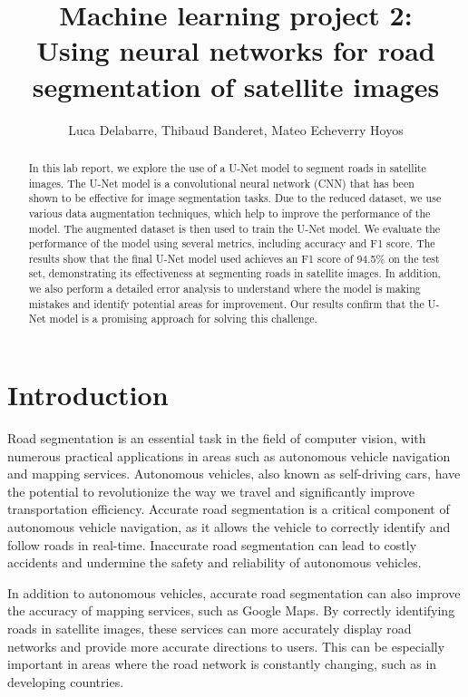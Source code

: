 \documentclass[10pt,conference,compsocconf]{IEEEtran}
\begin{document}
\title{\Large{Machine learning project 2:\\
Using neural networks for road segmentation of satellite images}}

\author{Luca Delabarre, Thibaud Banderet, Mateo Echeverry Hoyos}

\maketitle

\begin{abstract}
In this lab report, we explore the use of a U-Net model to segment roads in satellite images. The U-Net model is a convolutional neural network (CNN) that has been shown to be effective for image segmentation tasks. Due to the reduced dataset, we use various data augmentation techniques, which help to improve the performance of the model. The augmented dataset is then used to train the U-Net model. We evaluate the performance of the model using several metrics, including accuracy and F1 score. The results show that the final U-Net model used achieves an F1 score of 94.5\% on the test set, demonstrating its effectiveness at segmenting roads in satellite images. In addition, we also perform a detailed error analysis to understand where the model is making mistakes and identify potential areas for improvement. Our results confirm that the U-Net model is a promising approach for solving this challenge.
\end{abstract}

\section{Introduction}
Road segmentation is an essential task in the field of computer vision, with numerous practical applications in areas such as autonomous vehicle navigation and mapping services. Autonomous vehicles, also known as self-driving cars, have the potential to revolutionize the way we travel and significantly improve transportation efficiency. Accurate road segmentation is a critical component of autonomous vehicle navigation, as it allows the vehicle to correctly identify and follow roads in real-time. Inaccurate road segmentation can lead to costly accidents and undermine the safety and reliability of autonomous vehicles.

In addition to autonomous vehicles, accurate road segmentation can also improve the accuracy of mapping services, such as Google Maps. By correctly identifying roads in satellite images, these services can more accurately display road networks and provide more accurate directions to users. This can be especially important in areas where the road network is constantly changing, such as in developing countries.
\end{document}
